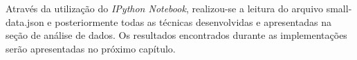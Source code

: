 Através da utilização do \textit{IPython Notebook}, realizou-se a leitura do arquivo small-data.json e posteriormente todas as técnicas desenvolvidas e apresentadas na seção de análise de dados. Os resultados encontrados durante as implementações serão apresentadas no próximo capítulo.
























